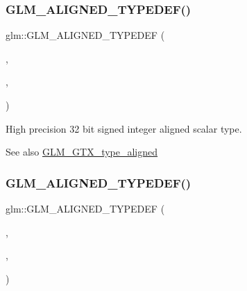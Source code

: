 \subsubsection{\texorpdfstring{G\+L\+M\+\_\+\+A\+L\+I\+G\+N\+E\+D\+\_\+\+T\+Y\+P\+E\+D\+E\+F()}{GLM\_ALIGNED\_TYPEDEF()}\hspace{0.1cm}{\footnotesize\ttfamily [31/209]}}
{\footnotesize\ttfamily glm\+::\+G\+L\+M\+\_\+\+A\+L\+I\+G\+N\+E\+D\+\_\+\+T\+Y\+P\+E\+D\+EF (\begin{DoxyParamCaption}\item[{\hyperlink{group__gtc__type__precision_ga783d077a513c1f475f6cdb406b4238c3}{highp\+\_\+int32\+\_\+t}}]{,  }\item[{aligned\+\_\+highp\+\_\+int32\+\_\+t}]{,  }\item[{4}]{ }\end{DoxyParamCaption})}

High precision 32 bit signed integer aligned scalar type. \begin{DoxySeeAlso}{See also}
\hyperlink{group__gtx__type__aligned}{G\+L\+M\+\_\+\+G\+T\+X\+\_\+type\+\_\+aligned} 
\end{DoxySeeAlso}
\mbox{\label{group__gtx__type__aligned_ga790cfff1ca39d0ed696ffed980809311}} 
\subsubsection{\texorpdfstring{G\+L\+M\+\_\+\+A\+L\+I\+G\+N\+E\+D\+\_\+\+T\+Y\+P\+E\+D\+E\+F()}{GLM\_ALIGNED\_TYPEDEF()}\hspace{0.1cm}{\footnotesize\ttfamily [32/209]}}
{\footnotesize\ttfamily glm\+::\+G\+L\+M\+\_\+\+A\+L\+I\+G\+N\+E\+D\+\_\+\+T\+Y\+P\+E\+D\+EF (\begin{DoxyParamCaption}\item[{\hyperlink{group__gtc__type__precision_ga0f5186bde44471133b08057cae8a51ac}{highp\+\_\+int64\+\_\+t}}]{,  }\item[{aligned\+\_\+highp\+\_\+int64\+\_\+t}]{,  }\item[{8}]{ }\end{DoxyParamCaption})}

